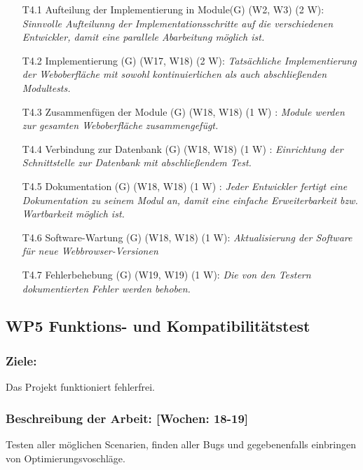 \documentclass{scrreprt}
\begin{document}
\begin{enumerate}
\item [T4.1] Aufteilung der Implementierung in Module(G) (W2, W3) (2 W): \emph{ Sinnvolle Aufteilunng der Implementationsschritte auf die verschiedenen Entwickler, damit eine parallele Abarbeitung möglich ist.}
\item [T4.2] Implementierung (G) (W17, W18) (2 W): \emph{ Tatsächliche Implementierung der Weboberfläche mit sowohl kontinuierlichen als auch abschließenden Modultests.}
\item [T4.3] Zusammenfügen der Module (G) (W18, W18) (1 W) : \emph{ Module werden zur gesamten Weboberfläche zusammengefügt.}
\item [T4.4] Verbindung zur Datenbank (G) (W18, W18) (1 W) : \emph{ Einrichtung der Schnittstelle zur Datenbank mit abschließendem Test.}
\item [T4.5] Dokumentation (G) (W18, W18) (1 W) : \emph{ Jeder Entwickler fertigt eine Dokumentation zu seinem Modul an, damit eine einfache Erweiterbarkeit bzw. Wartbarkeit möglich ist.}
\item [T4.6] Software-Wartung (G) (W18, W18) (1 W): \emph{ Aktualisierung der Software für neue Webbrowser-Versionen}
\item [T4.7] Fehlerbehebung (G) (W19, W19) (1 W): \emph{Die von den Testern dokumentierten Fehler werden behoben.}

\end{enumerate}

\subsection*{WP5 Funktions- und Kompatibilitätstest}

\subsubsection{Ziele:} Das Projekt funktioniert fehlerfrei.
\subsubsection{Beschreibung der Arbeit: [Wochen: 18-19]} Testen aller möglichen Scenarien, finden aller Bugs und gegebenenfalls einbringen von Optimierungsvoschläge.
\end{document}

